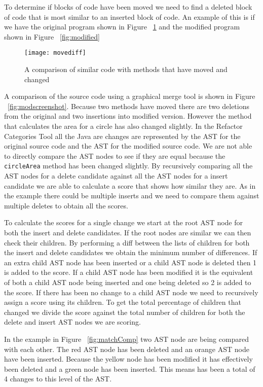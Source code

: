 To determine if blocks of code have been moved we need to find a deleted block of code that is most similar to an inserted block of code.  An example of this is if we have the original program shown in Figure ~\ref{fig:orig} and the modified program shown in Figure ~\ref{fig:modified}

\begin{figure}[!t]
\begin{center}
 \texttt{[image: movediff]}
 \end{center}
\caption{A comparison of similar code with methods that have moved and changed}
 \label{fig:orig}
\end{figure}


A comparison of the source code using a graphical merge tool is shown in Figure ~\ref{fig:modscreenshot}.  Because two methods have moved there are two deletions from the original and two insertions into modified version.  However the method that calculates the area for a circle has also changed slightly. In the Refactor Categories Tool all the Java are changes are represented by the AST for the original source code and the AST for the modified source code. We are not able to directly compare the AST nodes to see if they are equal because the \lstinline{circleArea} method has been changed slightly. By recursively comparing all the AST nodes for a delete candidate against all the AST nodes for a insert candidate we are able to calculate a score that shows how similar they are.  As in the example there could be multiple inserts and we need to compare them against multiple deletes to obtain all the scores.

To calculate the scores for a single change we start at the root AST node for both the insert and delete candidates.  If the root nodes are similar we can then check their children. By performing a diff between the lists of children for both the insert and delete candidates we obtain the minimum number of differences.  If an extra child AST node has been inserted or a child AST node is deleted then 1 is added to the score. If a child AST node has been modified it is the equivalent of both a child AST node being inserted and one being deleted so 2 is added to the score. If there has been no change to a child AST node we need to recursively assign a score using its children. To get the total percentage of children that changed we divide the score against the total number of children for both the delete and insert AST nodes we are scoring.

In the example in Figure ~\ref{fig:matchComp} two AST node are being compared with each other. The red AST node has been deleted and an orange AST node have been inserted. Because the yellow node has been modified it has effectively been deleted and a green node has been inserted. This means has been a total of 4 changes to this level of the AST. 

